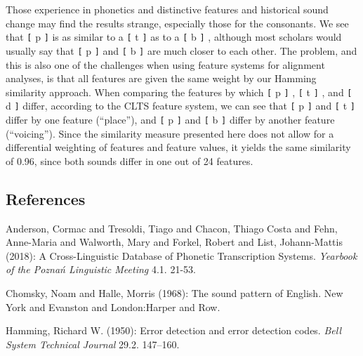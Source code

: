 \documentclass[
  a4paper,
  14pt,
  oneside,
  tablecaptionabove
]{scrbook}
\newcommand{\passthrough}[1]{#1}
\begin{document}
Those experience in phonetics and distinctive features and historical
sound change may find the results strange, especially those for the
consonants. We see that \passthrough{\lstinline![!} p
\passthrough{\lstinline!]!} is as similar to a
\passthrough{\lstinline![!} t \passthrough{\lstinline!]!} as to a
\passthrough{\lstinline![!} b \passthrough{\lstinline!]!} , although
most scholars would usually say that \passthrough{\lstinline![!} p
\passthrough{\lstinline!]!} and \passthrough{\lstinline![!} b
\passthrough{\lstinline!]!} are much closer to each other. The problem,
and this is also one of the challenges when using feature systems for
alignment analyses, is that all features are given the same weight by
our Hamming similarity approach. When comparing the features by which
\passthrough{\lstinline![!} p \passthrough{\lstinline!]!} ,
\passthrough{\lstinline![!} t \passthrough{\lstinline!]!} , and
\passthrough{\lstinline![!} d \passthrough{\lstinline!]!} differ,
according to the CLTS feature system, we can see that
\passthrough{\lstinline![!} p \passthrough{\lstinline!]!} and
\passthrough{\lstinline![!} t \passthrough{\lstinline!]!} differ by one
feature (\enquote{place}), and \passthrough{\lstinline![!} p
\passthrough{\lstinline!]!} and \passthrough{\lstinline![!} b
\passthrough{\lstinline!]!} differ by another feature
(\enquote{voicing}). Since the similarity measure presented here does
not allow for a differential weighting of features and feature values,
it yields the same similarity of 0.96, since both sounds differ in one
out of 24 features.

\subsection*{References}

\nopagebreak\hangindent=0.7cm {\small Anderson, Cormac and Tresoldi, Tiago and Chacon, Thiago Costa and
Fehn, Anne-Maria and Walworth, Mary and Forkel, Robert and List,
Johann-Mattis (2018): A Cross-Linguistic Database of Phonetic
Transcription Systems. \emph{Yearbook of the Poznań Linguistic Meeting}
4.1. 21-53. }

\nopagebreak\hangindent=0.7cm {\small Chomsky, Noam and Halle, Morris (1968): The sound pattern of
English. New York and Evanston and London:Harper and Row. }

\nopagebreak\hangindent=0.7cm {\small Hamming, Richard W. (1950): Error detection and error detection
codes. \emph{Bell System Technical Journal} 29.2. 147--160. }
\end{document}
